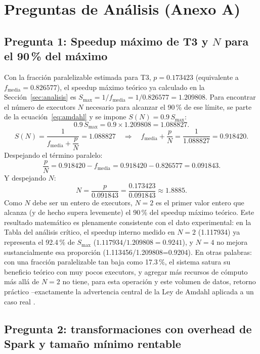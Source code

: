 \documentclass[11pt,a4paper]{article}
\begin{document}
\section{Preguntas de An\'alisis (Anexo A)}
\label{sec:preguntas}

\subsection*{Pregunta 1: Speedup m\'aximo de T3 y $N$ para el 90\,\% del m\'aximo}

Con la fracci\'on paralelizable estimada para T3, $p=0.173423$ (equivalente a
$f_{\text{media}}=0.826577$), el speedup m\'aximo te\'orico ya calculado en
la Secci\'on~\ref{sec:analisis} es $S_{\max}=1/f_{\text{media}}=1/0.826577=1.209808$.
Para encontrar el n\'umero de executors $N$ necesario para alcanzar el
90\,\% de ese l\'imite, se parte de la ecuaci\'on~\eqref{eq:amdahl} y se
impone $S(N)=0.9\,S_{\max}$:
\[
0.9\,S_{\max} = 0.9 \times 1.209808 = 1.088827 .
\]
\[
S(N) = \frac{1}{f_{\text{media}} + \dfrac{p}{N}} = 1.088827
\quad\Longrightarrow\quad
f_{\text{media}} + \frac{p}{N} = \frac{1}{1.088827} = 0.918420 .
\]
Despejando el t\'ermino paralelo:
\[
\frac{p}{N} = 0.918420 - f_{\text{media}} = 0.918420 - 0.826577 = 0.091843 .
\]
Y despejando $N$:
\[
N = \frac{p}{0.091843} = \frac{0.173423}{0.091843} \approx 1.8885 .
\]
Como $N$ debe ser un entero de executors, $N=2$ es el primer valor entero que
alcanza (y de hecho supera levemente) el 90\,\% del speedup m\'aximo
te\'orico. Este resultado matem\'atico es plenamente consistente con el dato
experimental: en la Tabla del an\'alisis cr\'itico, el speedup interno medido
en $N=2$ (1.117934) ya representa el 92.4\,\% de $S_{\max}$
($1.117934/1.209808=0.9241$), y $N=4$ no mejora sustancialmente esa
proporci\'on (1.113456/1.209808=0.9204). En otras palabras: con una
fracci\'on paralelizable tan baja como 17.3\,\%, el sistema satura su
beneficio te\'orico con muy pocos executors, y agregar m\'as recursos de
c\'omputo m\'as all\'a de $N=2$ no tiene, para esta operaci\'on y este
volumen de datos, retorno pr\'actico --exactamente la advertencia central de
la Ley de Amdahl aplicada a un caso real \cite{amdahl1967}.

\subsection*{Pregunta 2: transformaciones con overhead de Spark y tama\~no m\'inimo rentable}
\end{document}
